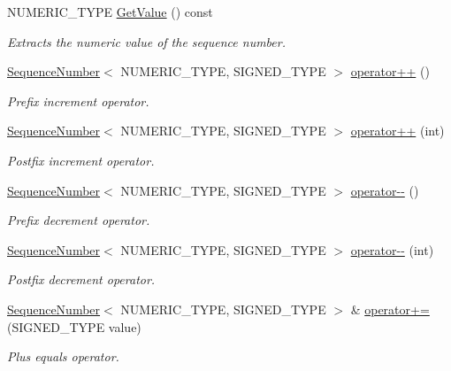 \begin{DoxyCompactItemize}
N\+U\+M\+E\+R\+I\+C\+\_\+\+T\+Y\+PE \hyperlink{classns3_1_1SequenceNumber_ad1dc215eb95f5371596af8ec914d3e72}{Get\+Value} () const 
\begin{DoxyCompactList}\small\item\em Extracts the numeric value of the sequence number. \end{DoxyCompactList}\item 
\hyperlink{classns3_1_1SequenceNumber}{Sequence\+Number}$<$ N\+U\+M\+E\+R\+I\+C\+\_\+\+T\+Y\+PE, S\+I\+G\+N\+E\+D\+\_\+\+T\+Y\+PE $>$ \hyperlink{classns3_1_1SequenceNumber_adfccefabf516f1a7da1669f453ff58d2}{operator++} ()
\begin{DoxyCompactList}\small\item\em Prefix increment operator. \end{DoxyCompactList}\item 
\hyperlink{classns3_1_1SequenceNumber}{Sequence\+Number}$<$ N\+U\+M\+E\+R\+I\+C\+\_\+\+T\+Y\+PE, S\+I\+G\+N\+E\+D\+\_\+\+T\+Y\+PE $>$ \hyperlink{classns3_1_1SequenceNumber_a6d6b83c8913dbf3a9459c2e88dbfaa95}{operator++} (int)
\begin{DoxyCompactList}\small\item\em Postfix increment operator. \end{DoxyCompactList}\item 
\hyperlink{classns3_1_1SequenceNumber}{Sequence\+Number}$<$ N\+U\+M\+E\+R\+I\+C\+\_\+\+T\+Y\+PE, S\+I\+G\+N\+E\+D\+\_\+\+T\+Y\+PE $>$ \hyperlink{classns3_1_1SequenceNumber_a8e035ba65217f261f4b8ee783d25ba20}{operator-\/-\/} ()
\begin{DoxyCompactList}\small\item\em Prefix decrement operator. \end{DoxyCompactList}\item 
\hyperlink{classns3_1_1SequenceNumber}{Sequence\+Number}$<$ N\+U\+M\+E\+R\+I\+C\+\_\+\+T\+Y\+PE, S\+I\+G\+N\+E\+D\+\_\+\+T\+Y\+PE $>$ \hyperlink{classns3_1_1SequenceNumber_a977ec4b66c409ccd06fa22743e3ce9b2}{operator-\/-\/} (int)
\begin{DoxyCompactList}\small\item\em Postfix decrement operator. \end{DoxyCompactList}\item 
\hyperlink{classns3_1_1SequenceNumber}{Sequence\+Number}$<$ N\+U\+M\+E\+R\+I\+C\+\_\+\+T\+Y\+PE, S\+I\+G\+N\+E\+D\+\_\+\+T\+Y\+PE $>$ \& \hyperlink{classns3_1_1SequenceNumber_a456997d997c24b9ba29727a4c5b9be81}{operator+=} (S\+I\+G\+N\+E\+D\+\_\+\+T\+Y\+PE value)
\begin{DoxyCompactList}\small\item\em Plus equals operator. \end{DoxyCompactList}\item 

\end{DoxyCompactItemize}
